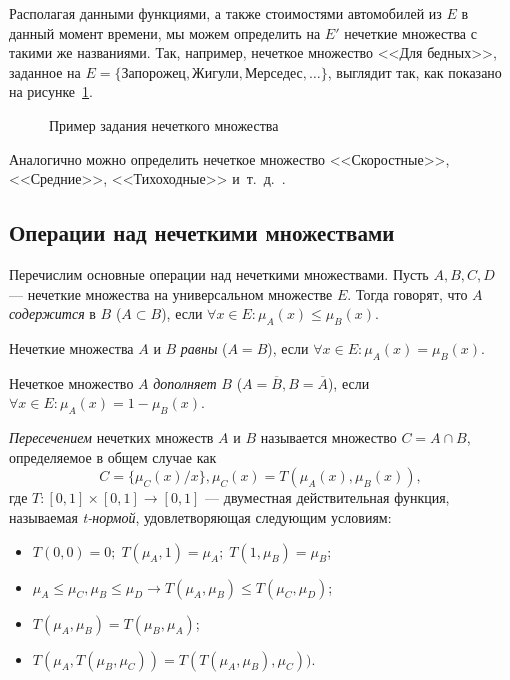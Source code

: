 Располагая данными функциями, а также стоимостями автомобилей из \( E \) в
данный момент времени, мы можем определить на \( E' \) нечеткие множества
с такими же названиями. Так, например, нечеткое множество <<Для бедных>>,
заданное на \( E = \{ \text{Запорожец}, \text{Жигули}, \text{Мерседес}, \ldots \} \),
выглядит так, как показано на рисунке~\ref{fig:example_set}.

\begin{figure}[h!]
  \centering
  \caption{Пример задания нечеткого множества}
  \label{fig:example_set}
\end{figure}

Аналогично можно определить нечеткое множество
<<Скоростные>>, <<Средние>>, <<Тихоходные>> и~т.~д.~\cite{kruglov2001}.

\pagebreak

\subsection{Операции над нечеткими множествами}

Перечислим основные операции над нечеткими множествами.
Пусть \( A, B, C, D \) --- нечеткие множества на универсальном множестве \( E \).
Тогда говорят, что \( A \) \emph{содержится} в \( B \) (\( A \subset B \)),
если \( \forall x \in E: \mu_A(x) \le \mu_B(x) \).

Нечеткие множества \( A \) и \( B \) \emph{равны} (\( A = B \)), если
\( \forall x \in E: \mu_A(x) = \mu_B(x) \).

Нечеткое множество \( A \) \emph{дополняет} \( B \) (\( A = \overline{B}, B = \overline{A} \)),
если \( \forall x \in E: \mu_A(x) = 1 - \mu_B(x) \).

\emph{Пересечением} нечетких множеств \( A \) и \( B \) называется множество
\( C = A \cap B \), определяемое в общем случае как
\[ C = \{ \mu_C(x) / x \}, \mu_C(x) = T(\mu_A(x), \mu_B(x)), \]
где \( T: [0, 1] \times [0,1] \rightarrow [0, 1] \) ---
двуместная действительная функция, называемая \emph{t-нормой},
удовлетворяющая следующим условиям:
\begin{itemize}
\item \( T(0, 0) = 0; \; T(\mu_A, 1) = \mu_A; \; T(1, \mu_B) = \mu_B \);
\item \( \mu_A \le \mu_C, \mu_B \le \mu_D \rightarrow T(\mu_A, \mu_B) \le T(\mu_C, \mu_D) \);
\item \( T(\mu_A, \mu_B) = T(\mu_B, \mu_A) \);
\item \( T(\mu_A, T(\mu_B, \mu_C)) = T(T(\mu_A, \mu_B), \mu_C)) \).
\end{itemize}

